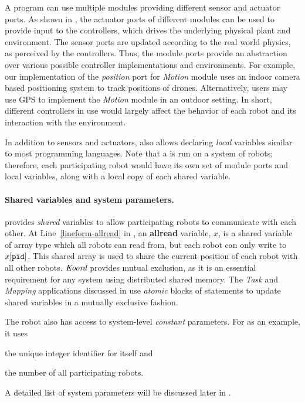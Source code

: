 A \lgname program can use multiple modules providing different sensor and actuator ports.
As shown in , the actuator ports of different modules can be used to provide input to the controllers,
which drives the underlying physical plant and environment.
The sensor ports are  updated according to the real world physics, as perceived by the controllers.
%
%
Thus, the module ports provide an abstraction over various possible controller implementations and environments.
For example, our implementation of the \emph{position} port for \emph{Motion} module uses an indoor camera based positioning system to track positions of drones.
Alternatively, users may use GPS to implement the \emph{Motion} module in an outdoor setting.
In short, different controllers in use would largely affect the behavior of each robot and its interaction with the environment.

In addition to sensors and actuators, \lgname also allows declaring \emph{local} variables similar to most programming languages.
Note that a \lgname is run on a system of robots;
therefore, each participating robot would have its own set of module ports and local variables, along with a local copy of each  shared variable.
%
%
\paragraph{Shared variables and system parameters.}
\lgname provides \emph{shared} variables to allow participating robots to communicate with each other.
At Line~\ref{lineform-allread} in , an \textbf{allread} variable, $x$, is a shared variable of array type which all robots can read from,
but each robot \myuin can only write to $x[\texttt{pid}]$.
This shared array is used to share the current position of each robot with all other robots. $\emph{Koord}$ provides mutual exclusion, as it is an essential requirement for any system using distributed shared memory. The \emph{Task} and \emph{Mapping} applications discussed in  use \emph{atomic} blocks of statements to update shared variables in a mutually exclusive fashion.

The robot also has access to system-level \emph{constant} parameters.
For \LineForm as an example, it uses
\begin{inparaenum}[(a)]
    \item the unique integer identifier \myuin for itself and
    \item the number \NMAX of all participating robots.
\end{inparaenum}
A detailed list of system parameters will be discussed later in .


